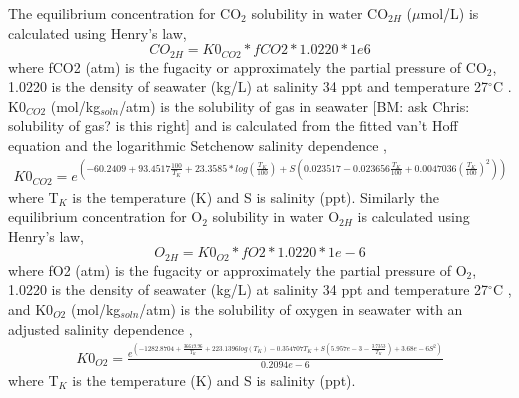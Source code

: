 \documentclass{ruthesis}
\begin{document}
The equilibrium concentration for CO$_2$ solubility in water CO$_{2H}$ ($\mu$mol/L) is calculated using Henry's law,
\begin{equation}\label{eq:CO2H_eq}
CO_{2H}=K0_{CO2}*fCO2*1.0220*1e6
\end{equation}
where fCO2 (atm) is the fugacity or approximately the partial pressure of CO$_2$, 1.0220 is the density of seawater (kg/L) at salinity 34 ppt and temperature 27$^{\circ}$C \cite{ramsing2011seawater} \cite{greensberg1992standard}. K0$_{CO2}$ (mol/kg$_{soln}$/atm) is the solubility of gas in seawater [BM: ask Chris: solubility of gas? is this right] and is calculated from the fitted van't Hoff equation and the logarithmic Setchenow salinity dependence \cite{weiss1974carbon},
\begin{equation}
\begin{aligned}
K0_{CO2} = e^{(- 60.2409 + 93.4517\frac{100}{T_K}  + 23.3585*log(\frac{T_K}{100})+ 
S(0.023517 - 0.023656\frac{T_K}{100} + 0.0047036(\frac{T_K}{100})^2))}
\end{aligned}
\end{equation}
where T$_K$ is the temperature (K) and S is salinity (ppt).
Similarly the equilibrium concentration for O$_2$ solubility in water O$_{2H}$ is calculated using Henry's law,
\begin{equation}\label{eq:O2H_eq}
O_{2H}=K0_{O2}*fO2*1.0220*1e-6
\end{equation}
where fO2 (atm) is the fugacity or approximately the partial pressure of O$_2$, 1.0220 is the density of seawater (kg/L) at salinity 34 ppt and temperature 27$^{\circ}$C \cite{ramsing2011seawater} \cite{greensberg1992standard}, and K0$_{O2}$ (mol/kg$_{soln}$/atm) is the solubility of oxygen in seawater with an adjusted salinity dependence \cite{battino1983solubility},
\begin{equation}
\begin{aligned}
K0_{O2} =  \frac{e^{(-1282.8704 + \frac{36619.96}{T_K} + 223.1396 log(T_K) -0.354707 T_K 
+ S(5.957e-3 -\frac{3.7353}{T_K}) + 3.68e-6 S^2)}}{0.2094e-6}
\end{aligned}
\end{equation}
where T$_K$ is the temperature (K) and S is salinity (ppt).
\end{document}
